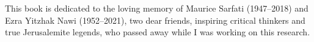 
This book is dedicated to the loving memory of Maurice Sarfati (1947–2018) and Ezra Yitzhak Nawi (1952–2021), two dear friends, inspiring critical thinkers and true Jerusalemite legends, who passed away while I was working on this research.
